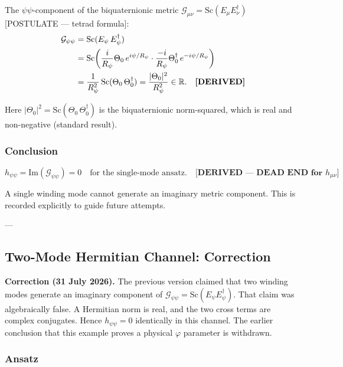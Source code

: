 The $\psi\psi$-component of the biquaternionic metric
$\mathcal{G}_{\mu\nu} = \mathrm{Sc}(E_\mu E_\nu^\dagger)$ [POSTULATE — tetrad formula]:
\begin{align}
  \mathcal{G}_{\psi\psi}
  &= \mathrm{Sc}(E_\psi\,E_\psi^\dagger) \notag\\
  &= \mathrm{Sc}\!\left(\frac{i}{R_\psi}\Theta_0\,e^{i\psi/R_\psi}
       \cdot \frac{-i}{R_\psi}\Theta_0^\dagger\,e^{-i\psi/R_\psi}\right) \notag\\
  &= \frac{1}{R_\psi^2}\,\mathrm{Sc}(\Theta_0\,\Theta_0^\dagger)
   = \frac{|\Theta_0|^2}{R_\psi^2} \in \mathbb{R}.
  \label{eq:single_mode_G_psipsi}
  \quad \textbf{[DERIVED]}
\end{align}

Here $|\Theta_0|^2 = \mathrm{Sc}(\Theta_0\,\Theta_0^\dagger)$ is the biquaternionic
norm-squared, which is real and non-negative (standard result).

\subsubsection{Conclusion}

\begin{equation}
  h_{\psi\psi} = \mathrm{Im}(\mathcal{G}_{\psi\psi}) = 0
  \quad \text{for the single-mode ansatz.}
  \label{eq:single_mode_dead_end}
  \quad \textbf{[DERIVED — DEAD END for $h_{\mu\nu}$]}
\end{equation}

A single winding mode cannot generate an imaginary metric component.
This is recorded explicitly to guide future attempts.

---

\subsection{Two-Mode Hermitian Channel: Correction}
\label{sec:two_mode_vacuum}

\noindent\textbf{Correction (31 July 2026).}
The previous version claimed that two winding modes generate an imaginary
component of $\mathcal G_{\psi\psi}=\mathrm{Sc}(E_\psi E_\psi^\dagger)$.
That claim was algebraically false.  A Hermitian norm is real, and the two
cross terms are complex conjugates.  Hence $h_{\psi\psi}=0$ identically in
this channel.  The earlier conclusion that this example proves a physical
$\varphi$ parameter is withdrawn.

\subsubsection{Ansatz}

